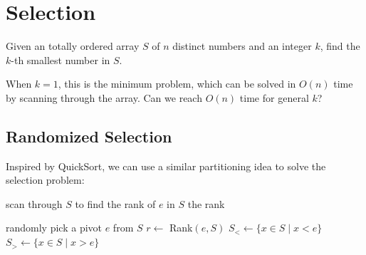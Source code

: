 \chapter{Selection}

\begin{problem}
Given an totally ordered array $S$ of $n$ distinct numbers and an integer $k$, find the $k$-th smallest number in $S$.
\end{problem}

When $k = 1$, this is the minimum problem, which can be solved in $O(n)$ time by scanning through the array. Can we reach $O(n)$ time for general $k$?

\section{Randomized Selection}

Inspired by QuickSort, we can use a similar partitioning idea to solve the selection problem:

\begin{algorithm}[H]
	\caption{Rank$(e,S)$}
	scan through $S$ to find the rank of $e$ in $S$\;
	\Return the rank\;
\end{algorithm}

\begin{algorithm}[H]
	\caption{QuickSelect$(k,S)$}
	randomly pick a pivot $e$ from $S$\;
	$r \gets$ Rank$(e,S)$\;
	$S_<\gets \{x \in S \mid x < e\}$\;
	$S_>\gets \{x \in S \mid x > e\}$\;
\end{algorithm}

